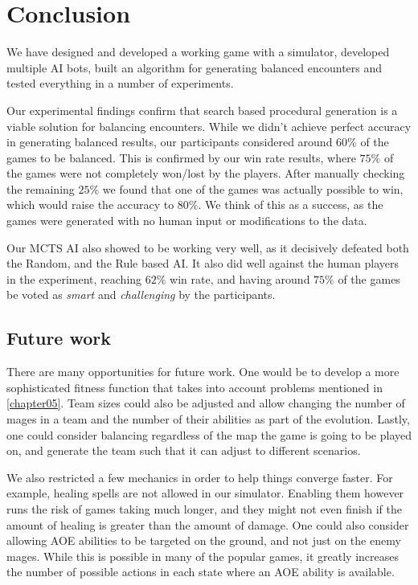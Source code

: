 \chapter{Conclusion}
\label{chapter06}

We have designed and developed a working game with a simulator, developed multiple
AI bots, built an algorithm for generating balanced encounters and tested everything
in a number of experiments.

Our experimental findings confirm that search based procedural generation
is a viable solution for balancing encounters. While we didn't achieve perfect
accuracy in generating balanced results, our participants considered around $60\%$
of the games to be balanced. This is confirmed by our win rate results, where $75\%$
of the games were not completely won/lost by the players. After manually checking the remaining
$25\%$ we found that one of the games was actually possible to win, which would raise the accuracy
to $80\%$. We think of this as a success, as the games were generated with no human input or modifications to the data.

Our MCTS AI also showed to be working very well, as it decisively defeated both the Random, and the Rule based AI.
It also did well against the human players in the experiment, reaching $62\%$ win rate, and having around $75\%$ of the
games be voted as \emph{smart} and \emph{challenging} by the participants.

\section{Future work}

There are many opportunities for future work. One would be to develop a more sophisticated fitness function that
takes into account problems mentioned in \autoref{chapter05}. Team sizes could also be adjusted and allow changing the number of mages in a team and the number of their abilities as part of the evolution. Lastly, one could consider balancing regardless of the map the game is going to be played on, and generate the team such that it can adjust to different scenarios.

We also restricted a few mechanics in order to help things converge faster. For example, healing spells are not allowed in our simulator. Enabling them however runs the risk of games taking much longer, and they might not even finish if the amount of healing is greater than the amount of damage. One could also consider allowing AOE abilities to be targeted on the ground, and not just on the enemy mages. While this is possible in many of the popular games, it greatly increases the number of possible actions in each state where an AOE ability is available.
